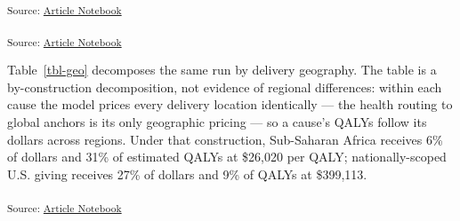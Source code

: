 \documentclass[
  11pt,
  letterpaper,
  DIV=11,
  numbers=noendperiod]{scrartcl}
\begin{document}
\textsubscript{Source:
\href{https://MaxGhenis.github.io/mackenzie-scott-qaly/index.qmd.html}{Article
Notebook}}

\textsubscript{Source:
\href{https://MaxGhenis.github.io/mackenzie-scott-qaly/index.qmd.html}{Article
Notebook}}

Table~\ref{tbl-geo} decomposes the same run by delivery geography. The
table is a by-construction decomposition, not evidence of regional
differences: within each cause the model prices every delivery location
identically --- the health routing to global anchors is its only
geographic pricing --- so a cause's QALYs follow its dollars across
regions. Under that construction, Sub-Saharan Africa receives 6\% of
dollars and 31\% of estimated QALYs at \$26,020 per QALY;
nationally-scoped U.S. giving receives 27\% of dollars and 9\% of QALYs
at \$399,113.

\textsubscript{Source:
\href{https://MaxGhenis.github.io/mackenzie-scott-qaly/index.qmd.html}{Article
Notebook}}
\end{document}
